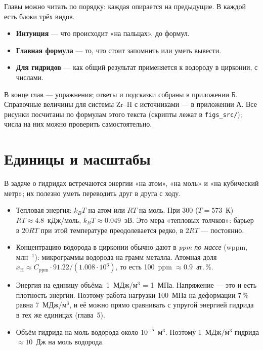 Главы можно читать по порядку: каждая опирается на предыдущие. В каждой есть блоки трёх видов.
\begin{itemize}
\item \textbf{\color{circ}Интуиция} --- что происходит «на пальцах», до формул.
\item \textbf{\color{load}Главная формула} --- то, что стоит запомнить или уметь вывести.
\item \textbf{\color{hydr}Для гидридов} --- как общий результат применяется к водороду в цирконии, с числами.
\end{itemize}
В конце глав --- упражнения; ответы и подсказки собраны в приложении Б. Справочные величины для системы Zr--H
с источниками --- в приложении А. Все рисунки посчитаны по формулам этого текста (скрипты лежат в
\texttt{figs\_src/}); числа на них можно проверить самостоятельно.

\section*{Единицы и масштабы}

В задаче о гидридах встречаются энергии «на атом», «на моль» и «на кубический метр»; их полезно уметь переводить
друг в друга с ходу.
\begin{itemize}
\item Тепловая энергия: $k_BT$ на атом или $RT$ на моль. При 300\degC{} ($T = 573$~К)
  $RT \approx 4.8$~кДж/моль, $k_BT \approx 0.049$~эВ. Это мера «тепловых толчков»: барьер в $20RT$ при этой
  температуре преодолевается редко, в $2RT$ --- постоянно.
\item Концентрацию водорода в цирконии обычно дают в \emph{ppm по массе} (wppm, млн$^{-1}$): микрограммы водорода
  на грамм металла. Атомная доля $x_{\mathrm H} \approx C_{\mathrm{ppm}} \cdot 91.22 / (1.008\cdot 10^6)$, то есть
  100~ppm $\approx 0.9$~ат.\,\%.
\item Энергия на единицу объёма: 1~МДж/м$^3$ = 1~МПа. Напряжение --- это и есть плотность энергии. Поэтому
  работа нагрузки 100~МПа на деформации 7\,\% равна 7~МДж/м$^3$, и её можно прямо сравнивать с упругой энергией
  гидрида в тех же единицах (глава~5).
\item Объём гидрида на моль водорода около $10^{-5}$~м$^3$. Поэтому 1~МДж/м$^3$ гидрида $\approx 10$~Дж на моль водорода.
\end{itemize}
